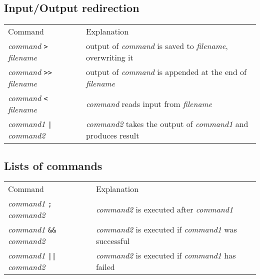 \subsection{Input/Output redirection}
\begin{tabular}{ll}
  Command & Explanation \\
  \hhline{==}
  \textit{command} \texttt{>} \textit{filename} & output of \textit{command} is saved to \textit{filename}, overwriting it \\
  \textit{command} \texttt{>>} \textit{filename} & output of \textit{command} is appended at the end of \textit{filename} \\
  \textit{command} \texttt{<} \textit{filename} & \textit{command} reads input from \textit{filename} \\
  \textit{command1} \texttt{|} \textit{command2} & \textit{command2} takes the output of \textit{command1} and produces result \\  
\end{tabular}

\subsection{Lists of commands}
\begin{tabular}{ll}
  Command & Explanation \\
  \hhline{==}
  \textit{command1} \texttt{;} \textit{command2} & \textit{command2} is executed after \textit{command1}\\
  \textit{command1} \texttt{\&\&} \textit{command2} & \textit{command2} is executed if \textit{command1} was successful\\
  \textit{command1} \texttt{||} \textit{command2} & \textit{command2} is executed if \textit{command1} has failed\\
\end{tabular}

